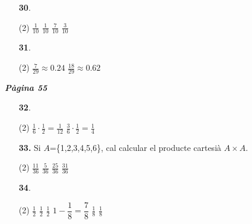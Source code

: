 \documentclass[a4paper, pdf, twoside]{book}
\begin{document}
\begin{multicols}{2}
\begin{enumerate}
 \item[\fontfamily{phv}\selectfont\color{blue}\textbf{30}. ] 
 \begin{tasks}[column-sep=1em, item-indent=1.3333em](2)
	 \task $\frac {1}{10}$
	 \task $\frac {1}{10}$
	 \task $\frac {7}{10}$
	 \task $\frac {3}{10}$
\end{tasks}
\vspace{0.25cm}



 \item[\fontfamily{phv}\selectfont\color{blue}\textbf{31}. ] 
 \begin{tasks}[column-sep=1em, item-indent=1.3333em](2)
	 \task $\frac {7}{29}\approx 0.24$
	 \task $\frac {18}{29}\approx 0.62$
\end{tasks}
 \end{enumerate}
\vspace{0.3cm}


{\textbf{\em Pàgina 55}} \hrulefill
\begin{enumerate}
\vspace{0.25cm}



 \item[\fontfamily{phv}\selectfont\color{blue}\textbf{32}. ] 
 \begin{tasks}[column-sep=1em, item-indent=1.3333em](2)
	 \task* $\frac {1}{6}\cdot \frac {1}{2}=\frac {1}{12}$
	 \task* $\frac {3}{6}\cdot \frac {1}{2}=\frac {1}{4}$
\end{tasks}
 \end{enumerate}
\begin{enumerate}
\vspace{0.25cm}
\item[\fontfamily{phv}\selectfont\color{blue}\textbf{33. }] 
Si $A$=\{1,2,3,4,5,6\}, cal calcular el producte cartesià $A\times A$.\par \begin{tasks}(2) \task $\frac {11}{36}$ \task $\frac {5}{36}$ \task $\frac {25}{36}$ \task $\frac {31}{36}$\end{tasks}
\vspace{0.25cm}



 \item[\fontfamily{phv}\selectfont\color{blue}\textbf{34}. ]  \scalebox{0.6}{\simbolclau } 
 \begin{tasks}[column-sep=1em, item-indent=1.3333em](2)
	 \task $\frac {1}{2}$
	 \task $\frac {1}{2}$
	 \task $\frac {1}{2}$
	 \task $1-\dfrac {1}{8}=\dfrac {7}{8}$
	 \task $\frac {1}{8}$
	 \task $\frac {1}{8}$
\end{tasks}
\vspace{0.25cm}



\end{enumerate}
\end{multicols}
\end{document}

